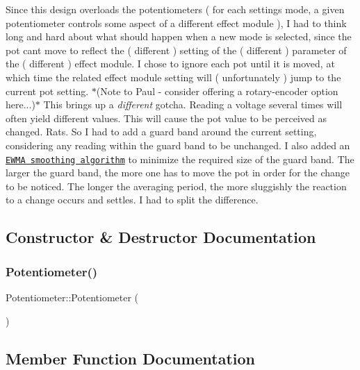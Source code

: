 Since this design overloads the potentiometers ( for each settings mode, a given potentiometer controls some aspect of a different effect module ), I had to think long and hard about what should happen when a new mode is selected, since the pot can\textquotesingle{}t move to reflect the ( different ) setting of the ( different ) parameter of the ( different ) effect module. I chose to ignore each pot until it is moved, at which time the related effect module setting will ( unfortunately ) jump to the current pot setting. $\ast$(Note to Paul -\/ consider offering a rotary-\/encoder option here...)$\ast$ This brings up a {\itshape different} gotcha. Reading a voltage several times will often yield different values. This will cause the pot value to be perceived as changed. Rats. So I had to add a guard band around the current setting, considering any reading within the guard band to be unchanged. I also added an \href{https://en.wikipedia.org/wiki/Moving_average}{\tt E\+W\+MA smoothing algorithm} to minimize the required size of the guard band. The larger the guard band, the more one has to move the pot in order for the change to be noticed. The longer the averaging period, the more sluggishly the reaction to a change occurs and settles. I had to split the difference. 

\subsection{Constructor \& Destructor Documentation}
\mbox{\label{class_potentiometer_a266317bbba4856942985925d044b969a}} 
\subsubsection{\texorpdfstring{Potentiometer()}{Potentiometer()}}
{\footnotesize\ttfamily Potentiometer\+::\+Potentiometer (\begin{DoxyParamCaption}{ }\end{DoxyParamCaption})}



\subsection{Member Function Documentation}
\mbox{\label{class_potentiometer_a518a49f1d9d85ae9bfea32fe6caff3e7}} 
